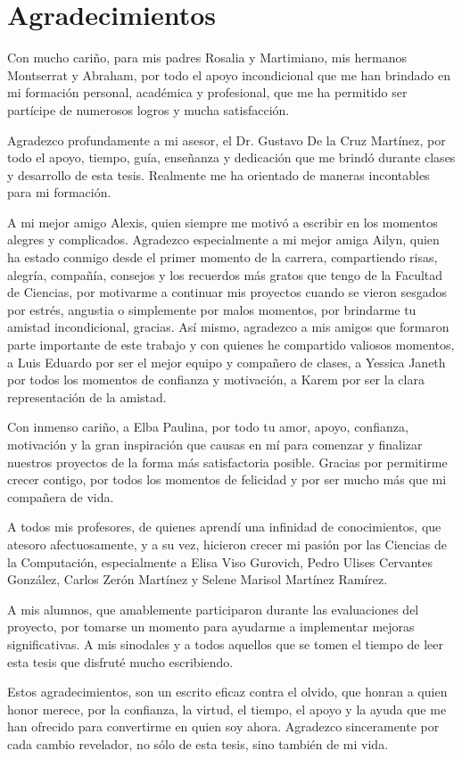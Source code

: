 \chapter*{Agradecimientos}

Con mucho cariño, para mis padres Rosalia y Martimiano, mis hermanos Montserrat y Abraham, por todo el apoyo incondicional que me han brindado en mi formación personal, académica y profesional, que me ha permitido ser partícipe de numerosos logros y mucha satisfacción.

Agradezco profundamente a mi asesor, el Dr. Gustavo De la Cruz Martínez, por todo el apoyo, tiempo, guía, enseñanza y dedicación que me brindó durante clases y desarrollo de esta tesis. Realmente me ha orientado de maneras incontables para mi formación.

A mi mejor amigo Alexis, quien siempre me motivó a escribir en los momentos alegres y complicados. Agradezco especialmente a mi mejor amiga Ailyn, quien ha estado conmigo desde el primer momento de la carrera, compartiendo risas, alegría, compañía, consejos y los recuerdos más gratos que tengo de la Facultad de Ciencias, por motivarme a continuar mis proyectos cuando se vieron sesgados por estrés, angustia o simplemente por malos momentos, por brindarme tu amistad incondicional, gracias. Así mismo, agradezco a mis amigos que formaron parte importante de este trabajo y con quienes he compartido valiosos momentos, a Luis Eduardo por ser el mejor equipo y compañero de clases, a Yessica Janeth por todos los momentos de confianza y motivación, a Karem por ser la clara representación de la amistad.

Con inmenso cariño, a Elba Paulina, por todo tu amor, apoyo, confianza, motivación y la gran inspiración que causas en mí para comenzar y finalizar nuestros proyectos de la forma más satisfactoria posible. Gracias por permitirme crecer contigo, por todos los momentos de felicidad y por ser mucho más que mi compañera de vida.

A todos mis profesores, de quienes aprendí una infinidad de conocimientos, que atesoro afectuosamente, y a su vez, hicieron crecer mi pasión por las Ciencias de la Computación, especialmente a Elisa Viso Gurovich, Pedro Ulises Cervantes González, Carlos Zerón Martínez y Selene Marisol Martínez Ramírez.

A mis alumnos, que amablemente participaron durante las evaluaciones del proyecto, por tomarse un momento para ayudarme a implementar mejoras significativas. A mis sinodales y a todos aquellos que se tomen el tiempo de leer esta tesis que disfruté mucho escribiendo.

Estos agradecimientos, son un escrito eficaz contra el olvido, que honran a quien honor merece, por la confianza, la virtud, el tiempo, el apoyo y la ayuda que me han ofrecido para convertirme en quien soy ahora. Agradezco sinceramente por cada cambio revelador, no sólo de esta tesis, sino también de mi vida.
